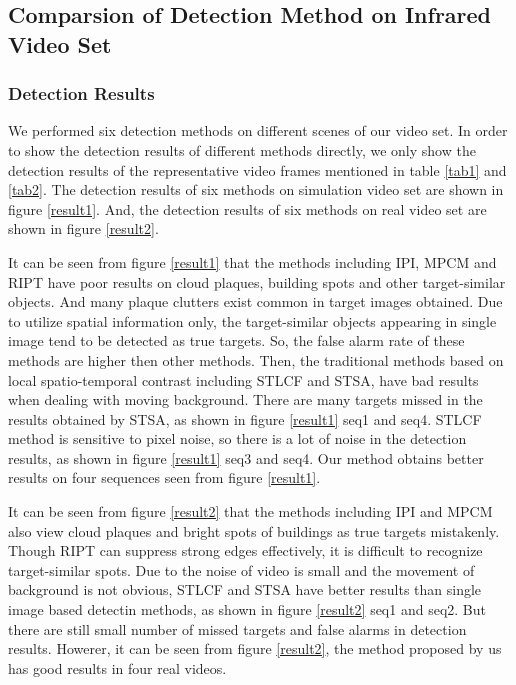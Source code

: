 \documentclass[journal]{IEEEtran}
\begin{document}
\subsection{Comparsion of Detection Method on Infrared Video Set}
\subsubsection{Detection Results}
We performed six detection methods on different scenes of our video set. In order to show the detection results of different methods directly, we only show the detection results of the representative video frames mentioned in table \ref{tab1} and \ref{tab2}. The detection results of six methods on simulation video set are shown in figure \ref{result1}. And, the detection results of six methods on real video set are shown in figure \ref{result2}.

It can be seen from figure \ref{result1} that the methods including IPI, MPCM and RIPT have poor results on cloud plaques, building spots and other target-similar objects. And many plaque clutters exist common in target images obtained. Due to utilize spatial information only, the target-similar objects appearing in single image tend to be detected as true targets. So, the false alarm rate of these methods are higher then other methods. Then, the traditional methods based on local spatio-temporal contrast including STLCF and STSA, have bad results when dealing with moving background. There are many targets missed in the results obtained by STSA, as shown in figure \ref{result1} seq1 and seq4. STLCF method is sensitive to pixel noise, so there is a lot of noise in the detection results, as shown in figure \ref{result1} seq3 and seq4. Our method obtains better results on four sequences seen from figure \ref{result1}.

It can be seen from figure \ref{result2} that the methods including IPI and MPCM also view cloud plaques and bright spots of buildings as true targets mistakenly. Though RIPT can suppress strong edges effectively, it is difficult to recognize target-similar spots. Due to the noise of video is small and the movement of background is not obvious, STLCF and STSA have better results than single image based detectin methods, as shown in figure \ref{result2} seq1 and seq2. But there are still small number of missed targets and false alarms in detection results. Howerer, it can be seen from figure \ref{result2}, the method proposed by us has good results in four real videos.
\end{document}
